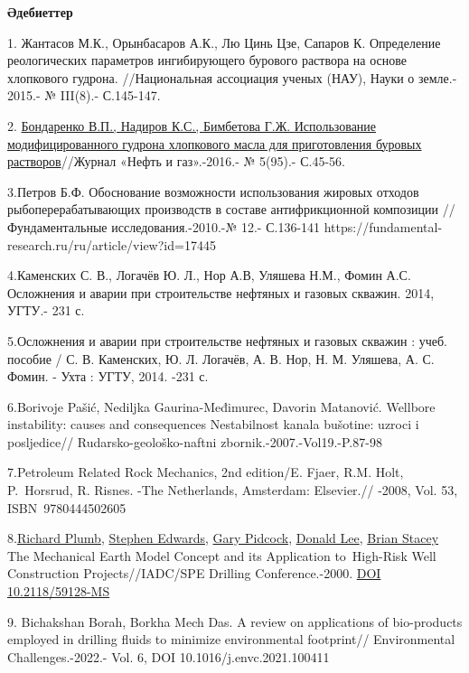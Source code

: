 \begin{center}
{\bfseries Әдебиеттер}
\end{center}

\begin{references}

1. Жантасов М.К., Орынбасаров А.К., Лю Цинь Цзе, Сапаров К. Определение
реологических параметров ингибирующего бурового раствора на основе
хлопкового гудрона. //Национальная ассоциация ученых (НАУ), Науки о
земле.- 2015.- № III(8).- С.145-147.

2.
\href{http://neft-gas.kz/f/no_5_2016_neft_i_gaz-dlya_sajta2-1.pdf}{Бондаренко
В.П., Надиров К.С., Бимбетова Г.Ж. Использование модифицированного
гудрона хлопкового масла для приготовления буровых растворов}//Журнал
«Нефть и газ».-2016.- № 5(95).- С.45-56.

3.Петров Б.Ф. Обоснование возможности использования жировых отходов
рыбоперерабатывающих производств в составе антифрикционной композиции //
Фундаментальные исследования.-2010.-№ 12.- С.136-141
https://fundamental-research.ru/ru/article/view?id=17445

4.Каменских С. В., Логачёв Ю. Л., Нор А.В, Уляшева Н.М., Фомин А.С.
Осложнения и аварии при строительстве нефтяных и газовых скважин. 2014,
УГТУ.- 231 с.

5.Осложнения и аварии при строительстве нефтяных и газовых скважин :
учеб. пособие / С. В. Каменских, Ю. Л. Логачёв, А. В. Нор, Н. М.
Уляшева, А. С. Фомин. - Ухта : УГТУ, 2014. -231 с.

6.Borivoje Pašić, Nediljka Gaurina-Međimurec, Davorin Matanović.
Wellbore instability: causes and consequences Nestabilnost kanala
bušotine: uzroci i posljedice// Rudarsko-geološko-naftni
zbornik.-2007.-Vol19.-P.87-98

7.Petroleum Related Rock Mechanics, 2nd edition/E. Fjaer, R.M. Holt,
P.~Horsrud, R. Risnes. -The Netherlands, Amsterdam: Elsevier.// -2008,
Vol. 53, ISBN~9780444502605

8.\href{javascript:;}{Richard Plumb}, \href{javascript:;}{Stephen
Edwards}, \href{javascript:;}{Gary Pidcock}, \href{javascript:;}{Donald
Lee}, \href{javascript:;}{Brian Stacey} The Mechanical Earth Model
Concept and its Application to~High-Risk Well Construction
Projects//IADC/SPE Drilling Conference.-2000.
\href{https://doi.org/10.2118/59128-MS}{DOI 10.2118/59128-MS}

9. Bichakshan Borah, Borkha Mech Das. A review on applications of
bio-products employed in drilling fluids to minimize environmental
footprint// Environmental Challenges.-2022.- Vol. 6, DOI
10.1016/j.envc.2021.100411


\end{references}
